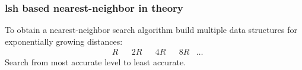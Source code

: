 \documentclass[compress]{beamer}
\begin{document}
\begin{frame}
	\frametitle{lsh based nearest-neighbor in theory}
	To obtain a nearest-neighbor search algorithm build multiple data structures for exponentially growing distances:
	\begin{align*}
	&R & &2 R & &4R & &8R & \ldots 
	\end{align*}
	Search from most accurate level to least accurate. 

	\begin{center}
	\end{center}
\end{frame}
\end{document}
